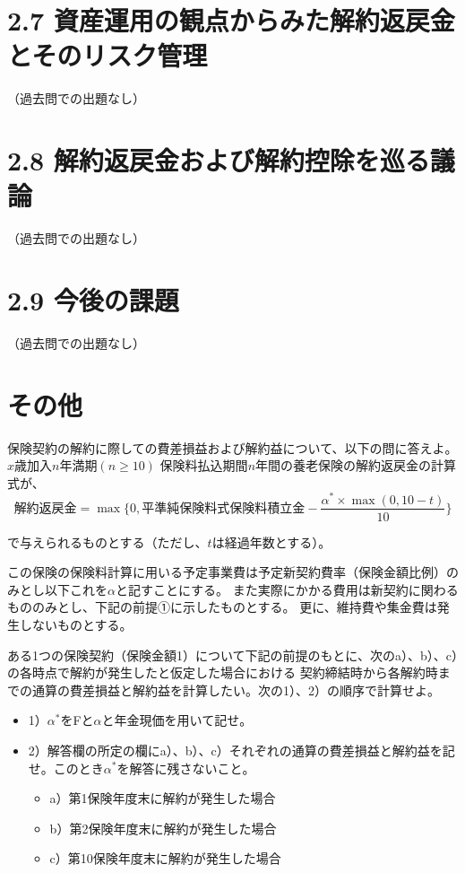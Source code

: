 \documentclass[report,gutter=10mm,fore-edge=10mm,uplatex,dvipdfmx]{jlreq}
\begin{document}
\section{2.7 資産運用の観点からみた解約返戻金とそのリスク管理}
（過去問での出題なし）
\section{2.8 解約返戻金および解約控除を巡る議論}
（過去問での出題なし）
\section{2.9 今後の課題}
（過去問での出題なし）

\section{その他}


保険契約の解約に際しての費差損益および解約益について、以下の問に答えよ。
$x$歳加入$n$年満期$(n\geq 10)$ 保険料払込期間$n$年間の養老保険の解約返戻金の計算式が、
$$
\text{解約返戻金}  =\max\{0,\text{平準純保険料式保険料積立金} -\frac{\alpha^{*} \times \max(0, 10 -t)}{10}\}
$$

で与えられるものとする（ただし、$t$は経過年数とする）。

この保険の保険料計算に用いる予定事業費は予定新契約費率（保険金額比例）のみとし以下これを$\alpha$と記すことにする。
また実際にかかる費用は新契約に関わるもののみとし、下記の前提①に示したものとする。
更に、維持費や集金費は発生しないものとする。

ある1つの保険契約（保険金額1）について下記の前提のもとに、次のa）、b）、c）の各時点で解約が発生したと仮定した場合における
契約締結時から各解約時までの通算の費差損益と解約益を計算したい。次の1）、2）の順序で計算せよ。
\begin{itemize}
 \item 1）$\alpha^{*}$をFと$\alpha$と年金現価を用いて記せ。
 \item 2）解答欄の所定の欄にa）、b）、c）それぞれの通算の費差損益と解約益を記せ。このとき$\alpha^{*}$を解答に残さないこと。
\begin{itemize}
 \item a）第1保険年度末に解約が発生した場合
 \item b）第2保険年度末に解約が発生した場合
 \item c）第10保険年度末に解約が発生した場合
\end{itemize}
\end{itemize}
\end{document}
